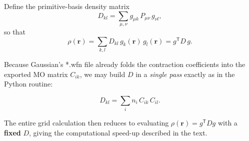 \documentclass{standalone}
\begin{document}
Define the primitive-basis density matrix
\begin{equation}
\label{eq:Dkl}
D_{kl}=\sum_{\mu,\nu}g_{\mu k}\,P_{\mu\nu}\,g_{\nu l},
\end{equation}
so that
\[
  \rho(\mathbf r)=\sum_{k,l}D_{kl}\,g_k(\mathbf r)\,g_l(\mathbf r)
  =g^{\mathsf T}D\,g.
\]

Because Gaussian’s *.wfn file already folds the contraction coefficients
into the exported MO matrix \(C_{ik}\), we may build \(D\) in a \emph{single
pass} exactly as in the Python routine:

\begin{equation}
\label{eq:denmat}
D_{kl}= \sum_{i} n_i\,C_{ik}\,C_{il}.
\end{equation}

The entire grid calculation then reduces to evaluating
\(\rho(\mathbf r)=g^{\mathsf T}Dg\) with a \textbf{fixed} \(D\), giving the
computational speed-up described in the text.
\end{document}

